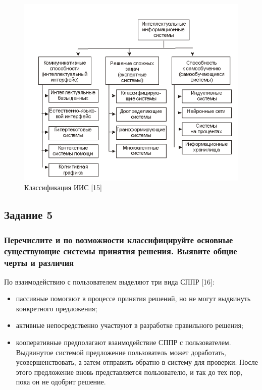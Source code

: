 \documentclass[14pt,a4paper,report]{report}
\begin{document}
\begin{figure}[h!]
	\centering
	\includegraphics[scale = 1.40]{images/iis.png}
	\caption{Классификация ИИС [15]}
	\label{image:1}
\end{figure}	


\subsection{Задание 5}

\subsubsection{Перечислите и по возможности классифицируйте основные существующие системы принятия решения. Выявите общие черты и различия}

По взаимодействию с пользователем выделяют три вида СППР [16]:

\begin{itemize}
	\item пассивные помогают в процессе принятия решений, но не могут выдвинуть конкретного предложения;
	\item активные непосредственно участвуют в разработке правильного решения;
	\item кооперативные предполагают взаимодействие СППР с пользователем. Выдвинутое системой предложение пользователь может доработать, усовершенствовать, а затем отправить обратно в систему для проверки. После этого предложение вновь представляется пользователю, и так до тех пор, пока он не одобрит решение.
\end{itemize}
\end{document}

